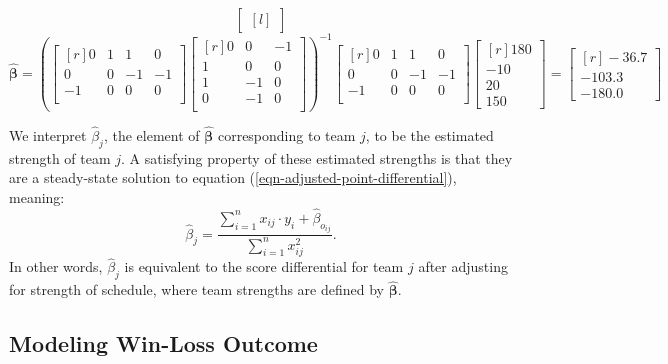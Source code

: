 \documentclass{article}
\begin{document}
\begin{framed}
$$\begin{bmatrix*}[l]
      \end{bmatrix*}
    $$
    $$
      \boldsymbol{\hat\beta} = \left(
        \begin{bmatrix*}[r]
          0 & 1 &  1 &  0\\
          0 & 0 & -1 & -1\\
         -1 & 0 &  0 &  0\\
        \end{bmatrix*}
        \begin{bmatrix*}[r]
          0 &  0 & -1\\
          1 &  0 &  0\\
          1 & -1 &  0\\
          0 & -1 &  0\\
        \end{bmatrix*}
      \right)^{-1}
      \begin{bmatrix*}[r]
        0 & 1 &  1 &  0\\
        0 & 0 & -1 & -1\\
       -1 & 0 &  0 &  0\\
      \end{bmatrix*}
      \begin{bmatrix*}[r] 180 \\ -10 \\ 20 \\ 150 \end{bmatrix*} =
      \begin{bmatrix*}[r] -36.7 \\ -103.3 \\ -180.0 \end{bmatrix*}
    $$
  \end{framed}

  We interpret $\hat\beta_j$, the element of $\boldsymbol{\hat\beta}$ corresponding to team $j$, to be the estimated strength of team $j$. A satisfying property of these estimated strengths is that they are a steady-state solution to equation (\ref{eqn-adjusted-point-differential}), meaning:
  \begin{equation}
    \label{eqn-satisfying-property}
    \hat\beta_j = \frac{
      \sum_{i=1}^n x_{ij} \cdot y_i + \hat\beta_{o_{ij}}
    }{
      \sum_{i=1}^n x_{ij}^2
    }.
  \end{equation}
  In other words, $\hat\beta_j$ is equivalent to the score differential for team $j$ after adjusting for strength of schedule, where team strengths are defined by $\boldsymbol{\hat\beta}$.

  \subsection{\sc Modeling Win-Loss Outcome}
\end{document}
